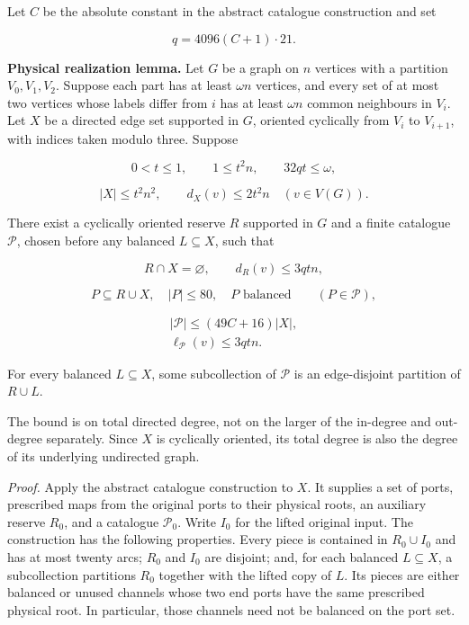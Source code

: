 \documentclass[english,11pt,a4paper]{article}
\begin{document}
Let \(C\) be the absolute constant in the abstract catalogue construction and set

\[q=4096(C+1)\cdot21.\]

\textbf{Physical realization lemma.} Let \(G\) be a graph on \(n\) vertices with a partition \(V_0,V_1,V_2\). Suppose each part has at least \(\omega n\) vertices, and every set of at most two vertices whose labels differ from \(i\) has at least \(\omega n\) common neighbours in \(V_i\). Let \(X\) be a directed edge set supported in \(G\), oriented cyclically from \(V_i\) to \(V_{i+1}\), with indices taken modulo three. Suppose

\[0<t\le1,\qquad 1\le t^2n,\qquad32qt\le\omega,\]

\[|X|\le t^2n^2,\qquad d_X(v)\le2t^2n\quad(v\in V(G)).\]

There exist a cyclically oriented reserve \(R\) supported in \(G\) and a finite catalogue \(\mathcal P\), chosen before any balanced \(L\subseteq X\), such that

\[R\cap X=\varnothing,\qquad d_R(v)\le3qtn,\]

\[P\subseteq R\cup X,\quad |P|\le80,\quad P\text{ balanced}
\qquad(P\in\mathcal P),\]

\[\begin{gathered}
|\mathcal P|\le(49C+16)|X|,\\
\ell_{\mathcal P}(v)\le3qtn.
\end{gathered}\]

For every balanced \(L\subseteq X\), some subcollection of \(\mathcal P\) is an edge-disjoint partition of \(R\cup L\).

The bound is on total directed degree, not on the larger of the in-degree and out-degree separately. Since \(X\) is cyclically oriented, its total degree is also the degree of its underlying undirected graph.

\emph{Proof.} Apply the abstract catalogue construction to \(X\). It supplies a set of ports, prescribed maps from the original ports to their physical roots, an auxiliary reserve \(R_0\), and a catalogue \(\mathcal P_0\). Write \(I_0\) for the lifted original input. The construction has the following properties. Every piece is contained in \(R_0\cup I_0\) and has at most twenty arcs; \(R_0\) and \(I_0\) are disjoint; and, for each balanced \(L\subseteq X\), a subcollection partitions \(R_0\) together with the lifted copy of \(L\). Its pieces are either balanced or unused channels whose two end ports have the same prescribed physical root. In particular, those channels need not be balanced on the port set.
\end{document}
